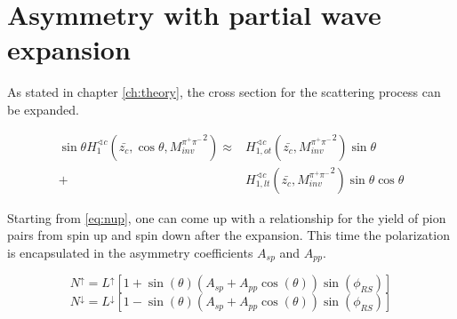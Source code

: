 \documentclass[abstract = on,listof=totoc, bibliography=totoc]{scrreprt}
\newcommand{\mpair}{M_{inv}^{\pi^+\pi^-}}
\begin{document}
\section{Asymmetry with partial wave expansion}
As stated in chapter \ref{ch:theory}, the cross section for the scattering process can be expanded. 

\begin{align}
\label{eq:partialwaveexpansion2}
\sin \theta H_1^{\sphericalangle c} (\bar{z_c},\cos \theta, {\mpair}^2) \approx &H^{\sphericalangle c}_{1,ot}(\bar{z_c},{\mpair}^2) \sin\theta \nonumber \\
+ &H^{\sphericalangle c}_{1,lt}(\bar{z_c},{\mpair}^2) \sin\theta \cos\theta
\end{align}

Starting from \ref{eq:nup}, one can come up with a relationship for the yield of pion pairs from spin up and spin down after the expansion. This time the polarization is encapsulated in the asymmetry coefficients $A_{sp}$ and $A_{pp}$. 

\begin{equation}
\label{}
N^\uparrow = L^\uparrow\left[1+\sin(\theta)\left(A_{sp}+A_{pp}\cos(\theta)\right)\sin(\phi_{RS})\right] 
\end{equation}
\begin{equation}
\label{}
N^\downarrow = L^\downarrow \left[1-\sin(\theta)\left(A_{sp}+A_{pp}\cos(\theta)\right)\sin(\phi_{RS})\right]
\end{equation}
\end{document}
